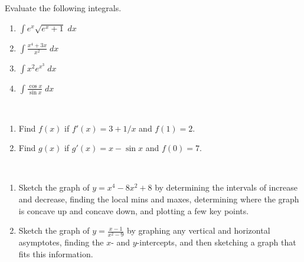 \documentclass{article}[12pt]
\newcommand{\ds}{\displaystyle}
\newcommand{\dx}{\; dx}
\begin{document}
\begin{problem}
Evaluate the following integrals.
\begin{multicols}{2}
\begin{enumerate}
\item ${\ds \int e^x \sqrt{e^x + 1} \dx}$
\answer{${\ds (2/3) (e^x + 1)^{3/2} + C}$}
\item ${\ds \int \frac{x^4 + 3x}{x^2} \dx}$
\answer{${\ds x^3/3 + 3 \ln |x| + C}$}
\item ${\ds \int x^2 e^{x^3} \dx}$
\answer{${\ds (1/3) e^{x^3} + C}$}
\item ${\ds \int \frac{\cos x}{\sin x} \dx}$
\answer{${\ds \ln |\sin x| + C}$}
\end{enumerate}
\end{multicols}
\end{problem}

\begin{problem}~
\begin{enumerate}
\item Find $f(x)$ if $f'(x) = 3 + 1/x$ and $f(1) = 2$.
\item Find $g(x)$ if $g'(x) = x - \sin x$ and $f(0) = 7$.
\end{enumerate}
\end{problem}

\begin{problem}~
\begin{enumerate}
\item Sketch the graph of $y = x^4 - 8x^2 + 8$ by determining the intervals of increase and decrease, finding the local mins and maxes, determining where the graph is concave up and concave down, and plotting a few key points.


\item Sketch the graph of $y = \frac{x-1}{x^2-9}$ by graphing any vertical and horizontal asymptotes, finding the $x$- and
$y$-intercepts, and then sketching a graph that fits this information.

\end{enumerate}
\end{problem}
\end{document}
